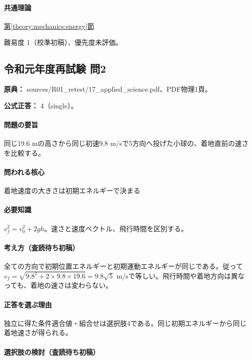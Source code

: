 \paragraph{共通理論} \hyperref[theory:mechanics:energy]{第\ref*{theory:mechanics:energy}節}

\par 難易度 1（校準初稿）、優先度未評価。

\subsection{令和元年度再試験 問2}
\label{q:r01-ret-applied-02}

\noindent\textbf{原典：} sources/R01\_retest/17\_applied\_science.pdf、PDF物理1頁。

\textbf{公式正答：} 4（single）。

\paragraph{問題の要旨} 同じ19.6 mの高さから同じ初速9.8 m/sで5方向へ投げた小球の、着地直前の速さを比較する。

\paragraph{問われる核心} 着地速度の大きさは初期エネルギーで決まる

\paragraph{必要知識} \(v_f^2=v_0^2+2gh\)。速さと速度ベクトル、飛行時間を区別する。

\paragraph{考え方（査読待ち初稿）} 全ての方向で初期位置エネルギーと初期運動エネルギーが同じである。従って\(v_f=\sqrt{9.8^2+2\times9.8\times19.6}=9.8\sqrt5\) m/sで等しい。飛行時間や着地方向は異なっても、着地の速さは変わらない。

\paragraph{正答を選ぶ理由} 独立に得た条件適合値・組合せは選択肢4である。同じ初期エネルギーから同じ着地速さが得られる。

\paragraph{選択肢の検討（査読待ち初稿）}\mbox{}\par

